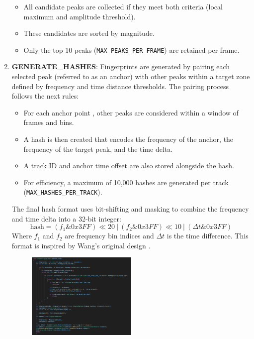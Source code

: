 \documentclass[11pt, a4paper]{article}
\begin{document}
\begin{enumerate}
\begin{itemize}
            \item All candidate peaks are collected if they meet both criteria (local maximum and amplitude threshold).
            \item These candidates are sorted by magnitude.
            \item Only the top 10 peaks (\texttt{MAX\_PEAKS\_PER\_FRAME}) are retained per frame.
        \end{itemize}
        \item \textbf{GENERATE\_HASHES}: Fingerprints are generated by pairing each selected peak (referred to as an anchor) with other peaks within a target zone defined by frequency 
        and time distance thresholds. The pairing process follows the next rules:
        \begin{itemize}
            \item For each anchor point , other peaks are considered within a window of frames and  bins.
            \item A hash is then created that encodes the frequency of the anchor, the frequency of the target peak, and the time delta.
            \item A track ID and anchor time offset are also stored alongside the hash.
            \item For efficiency, a maximum of 10,000 hashes are generated per track \newline (\texttt{MAX\_HASHES\_PER\_TRACK}).
        \end{itemize}
        The final hash format uses bit-shifting and masking to combine the frequency and time delta into a 32-bit integer:
        \begin{equation}
            \text{hash} = (f_1 \& 0x3FF) \ll 20 \ | \ (f_2 \& 0x3FF) \ll 10 \ | \ (\Delta t \& 0x3FF)
        \end{equation}
        Where \( f_1 \) and \( f_2 \) are frequency bin indices and \( \Delta t \) is the time difference. This format is inspired by Wang's original design \cite{ShazamAlgorithmPaper}.
        \begin{figure}[H]
            \centering
            \includegraphics[width=0.5\textwidth]{media/generate_hashes.png}

\end{figure}
\end{enumerate}
\end{document}
